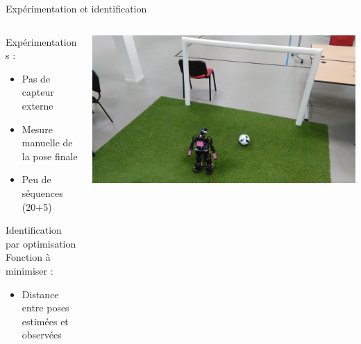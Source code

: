 \begin{frame}{Expérimentation et identification}
    \begin{columns}
        \begin{column}{0.5\linewidth}
            Expérimentations :
            \begin{itemize}
                \item Pas de capteur externe
                \item Mesure manuelle de la pose finale
                \item Peu de séquences (20+5)
            \end{itemize}
            \vspace{1.0em}
            Identification par optimisation\\
            \vspace{1.0em}
            Fonction à minimiser :
            \begin{itemize}
                \item Distance entre poses estimées et observées
            \end{itemize}
        \end{column}
        \begin{column}{0.5\linewidth}
            \centering
            \includegraphics[width=1.0\linewidth]{../media/odometry_cmaes_setup.jpg}
            \vspace{1.0em}
            \small
        \end{column}
    \end{columns}
\end{frame}

